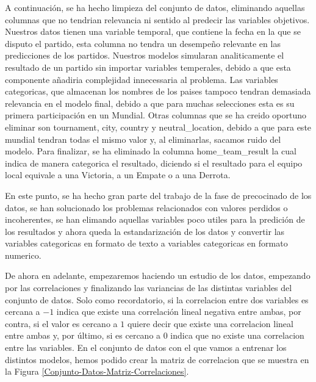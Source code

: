 A continuación, se ha hecho limpieza del conjunto de datos, eliminando aquellas columnas que no tendrian relevancia ni sentido al predecir las variables objetivos. Nuestros datos tienen una variable temporal, que contiene la fecha en la que se disputo el partido, esta columna no tendra un desempeño relevante en las predicciones de los partidos. Nuestros modelos simularan analiticamente el resultado de un partido sin importar variables temperales, debido a que esta componente añadiria complejidad innecessaria al problema. Las variables categoricas, que almacenan los nombres de los paises tampoco tendran demasiada relevancia en el modelo final, debido a que para muchas selecciones esta es su primera participación en un Mundial. Otras columnas que se ha creido oportuno eliminar son tournament, city, country y neutral\_location, debido a que para este mundial tendran todas el mismo valor y, al eliminarlas, sacamos ruido del modelo. Para finalizar, se ha eliminado la columna home\_team\_result la cual indica de manera categorica el resultado, diciendo si el resultado para el equipo local equivale a una Victoria, a un Empate o a una Derrota. 
\newline

En este punto, se ha hecho gran parte del trabajo de la fase de precocinado de los datos, se han solucionado los problemas relacionados con valores perdidos o incoherentes, se han elimando aquellas variables poco utiles para la predición de los resultados y ahora queda la estandarización de los datos y convertir las variables categoricas en formato de texto a variables categoricas en formato numerico. 
\newline

De ahora en adelante, empezaremos haciendo un estudio de los datos, empezando por las correlaciones y finalizando las variancias de las distintas variables del conjunto de datos. Solo como recordatorio, si la correlacion entre dos variables es cercana a $-1$ indica que existe una correlación lineal negativa entre ambas, por contra, si el valor es cercano a $1$ quiere decir que existe una correlacion lineal entre ambas y, por último, si es cercano a $0$ indica que no existe una correlacion entre las variables. En el conjunto de datos con el que vamos a entrenar los distintos modelos, hemos podido crear la matriz de correlacion que se muestra en la Figura \ref{Conjunto-Datos-Matriz-Correlaciones}.

